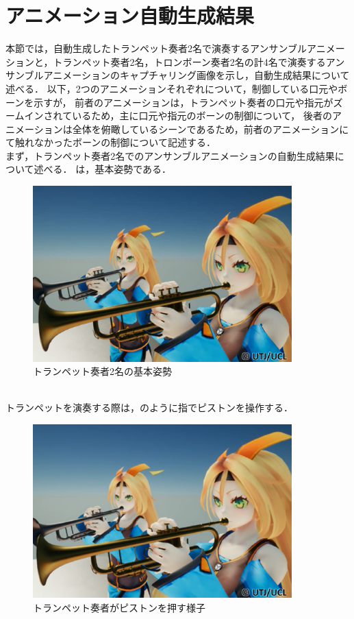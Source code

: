 \section{アニメーション自動生成結果} \label{sec:result}
本節では，自動生成したトランペット奏者2名で演奏するアンサンブルアニメーションと，トランペット奏者2名，トロンボーン奏者2名の計4名で演奏するアンサンブルアニメーションのキャプチャリング画像を示し，自動生成結果について述べる．
以下，2つのアニメーションそれぞれについて，制御している口元やボーンを示すが，
前者のアニメーションは，トランペット奏者の口元や指元がズームインされているため，主に口元や指元のボーンの制御について，
後者のアニメーションは全体を俯瞰しているシーンであるため，前者のアニメーションにて触れなかったボーンの制御について記述する．\\
\indent
まず，トランペット奏者2名でのアンサンブルアニメーションの自動生成結果について述べる．
は，基本姿勢である．
\begin{figure}[!h]
	\centering
	\includegraphics[width=10cm]{fig/chap4/anim1.eps}
	\caption{トランペット奏者2名の基本姿勢}
	\label{fig:anim1}
\end{figure}
\\
トランペットを演奏する際は，のように指でピストンを操作する．
\begin{figure}[!h]
	\centering
	\includegraphics[width=10cm]{fig/chap4/anim1_finger.eps}
	\caption{トランペット奏者がピストンを押す様子}
	\label{fig:anim1_finger}
\end{figure}

